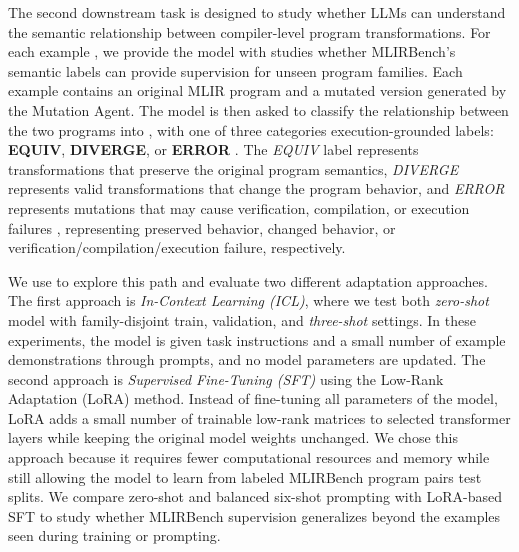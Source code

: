 \documentclass[sigplan,screen,review,anonymous]{acmart}
\providecommand{\DIFadd}[1]{{\protect\color{blue} \sf #1}} %
\providecommand{\DIFdel}[1]{{\protect\color{red} \scriptsize #1}} %
\providecommand{\DIFaddbegin}{} %
\providecommand{\DIFaddend}{} %
\providecommand{\DIFdelbegin}{} %
\providecommand{\DIFdelend}{} %
\begin{document}

\DIFdelend The second downstream task \DIFdelbegin \DIFdel{is designed to study whether LLMs can understand the semantic relationship between compiler-level program transformations. For each example , we provide the model with }\DIFdelend \DIFaddbegin \DIFadd{studies whether MLIRBench's semantic labels can
provide supervision for unseen program families. Each example contains }\DIFaddend an
original MLIR program and a mutated version\DIFdelbegin \DIFdel{generated by the Mutation Agent. The model is then asked to classify the relationship between the two programs into }\DIFdelend \DIFaddbegin \DIFadd{, with }\DIFaddend one of three
\DIFdelbegin \DIFdel{categories}\DIFdelend \DIFaddbegin \DIFadd{execution-grounded labels}\DIFaddend : \textbf{EQUIV}, \textbf{DIVERGE}, or
\textbf{ERROR}\DIFdelbegin \DIFdel{. The \textit{EQUIV} label represents transformations that preserve the original program semantics, \textit{DIVERGE} represents valid transformations that change the program behavior, and \textit{ERROR} represents mutations that may cause verification, compilation, or
execution failures}\DIFdelend \DIFaddbegin \DIFadd{, representing preserved behavior, changed behavior, or
verification/compilation/execution failure, respectively}\DIFaddend .

We use  \DIFdelbegin \DIFdel{to explore this path and evaluate two different adaptation approaches. The first approach is \textit{In-Context Learning (ICL)}, where we test both \textit{zero-shot} }\DIFdelend \DIFaddbegin \DIFadd{model with family-disjoint train, validation, }\DIFaddend and \DIFdelbegin \DIFdel{\textit{three-shot} settings. In these experiments, the model is given task instructions and a small number of example demonstrations through prompts, and no model parameters are updated. The second approach is \textit{Supervised Fine-Tuning (SFT)} using the Low-Rank Adaptation (LoRA) method. Instead of fine-tuning all parameters of the model, LoRA adds a small number of trainable low-rank matrices to selected transformer layers while keeping the original model weights unchanged. We chose this approach because it requires fewer computational resources and memory while still allowing the model to learn from labeled MLIRBench program pairs}\DIFdelend \DIFaddbegin \DIFadd{test splits. We compare zero-shot and balanced six-shot prompting with LoRA-based SFT to study whether MLIRBench supervision generalizes beyond the examples seen during training or prompting}\DIFaddend .
\end{document}
